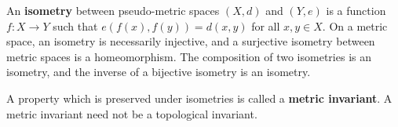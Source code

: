 An \textbf{isometry} between pseudo-metric spaces $(X,d)$ and $(Y,e)$ is a function $f : X \to Y$ such that $e(f(x), f(y)) = d(x,y)$ for all $x, y \in X$. On a metric space, an isometry is necessarily injective, and a surjective isometry between metric spaces is a homeomorphism. The composition of two isometries is an isometry, and the inverse of a bijective isometry is an isometry.

A property which is preserved under isometries is called a \textbf{metric invariant}. A metric invariant need not be a topological invariant.
